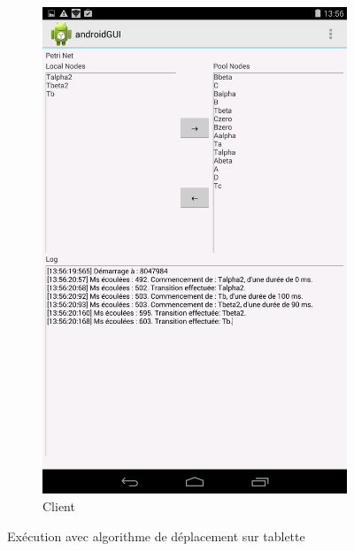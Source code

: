 \begin{figure}
		
		\begin{subfigure}{0.5\textwidth}
			\centering
			\includegraphics[scale=0.16]{images/resultats/client_algo_wifi.png}
			\caption{Client}
		\end{subfigure}
		
		\caption{Exécution avec algorithme de déplacement sur tablette}
		\label{fig.androDepl}
	\end{figure}
	
	